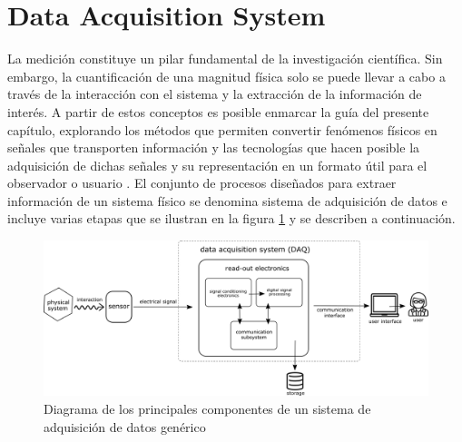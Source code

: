 \documentclass[]{book}
\begin{document}
\chapter*{Data Acquisition System }

\noindent La medición constituye un pilar fundamental de la investigación científica. Sin embargo, la cuantificación de una magnitud física solo se puede llevar a cabo a través de la interacción con el sistema y la extracción de la información de interés. A partir de estos conceptos es posible enmarcar la guía del presente capítulo, explorando los métodos que permiten convertir fenómenos físicos en señales que transporten información y las tecnologías que hacen posible la adquisición de dichas señales y su representación en un formato útil para el observador o  usuario \cite{webster2018measurement}. El conjunto de procesos diseñados para extraer información de un sistema físico se denomina sistema de adquisición de datos e incluye varias etapas que se ilustran en la figura \ref{fig:DAQ_generic} y se describen a continuación.\\

\begin{figure}[h]
    \centering
    \includegraphics[width=1.0\textwidth]{DAQ_chain.png}
    \caption{Diagrama de los principales componentes de un sistema de adquisición de datos genérico}
    \label{fig:DAQ_generic}

\end{figure}
\end{document}
